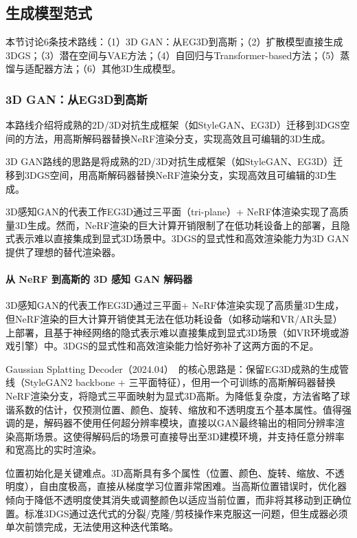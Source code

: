 \subsection{生成模型范式}
\label{sec:08_4_1}

本节讨论6条技术路线：（1）3D GAN：从EG3D到高斯；（2）扩散模型直接生成3DGS；（3）潜在空间与VAE方法；（4）自回归与Transformer-based方法；（5）蒸馏与适配器方法；（6）其他3D生成模型。

\subsubsection{3D GAN：从EG3D到高斯}

本路线介绍将成熟的2D/3D对抗生成框架（如StyleGAN、EG3D）迁移到3DGS空间的方法，用高斯解码器替换NeRF渲染分支，实现高效且可编辑的3D生成。

3D GAN路线的思路是将成熟的2D/3D对抗生成框架（如StyleGAN、EG3D）迁移到3DGS空间，用高斯解码器替换NeRF渲染分支，实现高效且可编辑的3D生成。

3D感知GAN的代表工作EG3D通过三平面（tri-plane）+ NeRF体渲染实现了高质量3D生成。然而，NeRF渲染的巨大计算开销限制了在低功耗设备上的部署，且隐式表示难以直接集成到显式3D场景中。3DGS的显式性和高效渲染能力为3D GAN提供了理想的替代渲染器。

\paragraph{从 NeRF 到高斯的 3D 感知 GAN 解码器}

3D感知GAN的代表工作EG3D通过三平面+ NeRF体渲染实现了高质量3D生成，但NeRF渲染的巨大计算开销使其无法在低功耗设备（如移动端和VR/AR头显）上部署，且基于神经网络的隐式表示难以直接集成到显式3D场景（如VR环境或游戏引擎）中。3DGS的显式性和高效渲染能力恰好弥补了这两方面的不足。

Gaussian Splatting Decoder（2024.04）~\cite{2404_10625}的核心思路是：保留EG3D成熟的生成管线（StyleGAN2 backbone + 三平面特征），但用一个可训练的高斯解码器替换NeRF渲染分支，将隐式三平面映射为显式3D高斯。为降低复杂度，方法省略了球谐系数的估计，仅预测位置、颜色、旋转、缩放和不透明度五个基本属性。值得强调的是，解码器不使用任何超分辨率模块，直接以GAN最终输出的相同分辨率渲染高斯场景。这使得解码后的场景可直接导出至3D建模环境，并支持任意分辨率和宽高比的实时渲染。

位置初始化是关键难点。3D高斯具有多个属性（位置、颜色、旋转、缩放、不透明度），自由度极高，直接从梯度学习位置非常困难。当高斯位置错误时，优化器倾向于降低不透明度使其消失或调整颜色以适应当前位置，而非将其移动到正确位置。标准3DGS通过迭代式的分裂/克隆/剪枝操作来克服这一问题，但生成器必须单次前馈完成，无法使用这种迭代策略。

